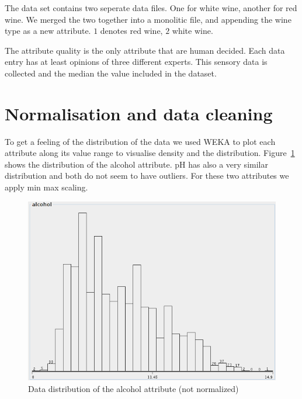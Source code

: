 \documentclass{acm_proc_article-sp}
\begin{document}
The data set contains two seperate data files. One for white wine,
another for red wine. We merged the two together into a monolitic file,
and appending the wine type as a new attribute. $1$ denotes red wine, $2$ white wine.

The attribute quality is the only attribute that are human decided.
Each data entry has at least opinions of three different experts. This
sensory data is collected and the median the value included in the
dataset.

\section{Normalisation and data cleaning}

To get a feeling of the distribution of the data we used
WEKA to plot each attribute along its value range to visualise
density and the distribution.
Figure~\ref{fig:dist-alcohol} shows the distribution of the alcohol attribute. pH has
also a very similar distribution and both do not seem to have outliers.
For these two attributes we apply min max scaling.

\begin{figure}
\centering
\includegraphics[width=\linewidth]{img/dist-alcohol}
\caption{Data distribution of the alcohol attribute (not normalized)}
\label{fig:dist-alcohol}
\end{figure}
\end{document}
